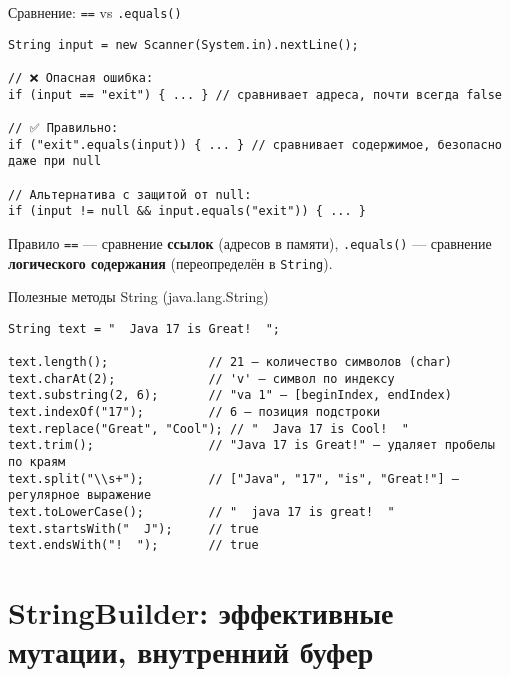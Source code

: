 \documentclass[aspectratio=169]{beamer}
\begin{document}
\begin{frame}[fragile]{Сравнение: \texttt{==} vs \texttt{.equals()}}
\lstset{language=JavaLite}
\begin{lstlisting}
String input = new Scanner(System.in).nextLine();

// ❌ Опасная ошибка:
if (input == "exit") { ... } // сравнивает адреса, почти всегда false

// ✅ Правильно:
if ("exit".equals(input)) { ... } // сравнивает содержимое, безопасно даже при null

// Альтернатива с защитой от null:
if (input != null && input.equals("exit")) { ... }
\end{lstlisting}
  \begin{block}{Правило}
    \texttt{==} — сравнение \textbf{ссылок} (адресов в памяти),  
    \texttt{.equals()} — сравнение \textbf{логического содержания} (переопределён в \texttt{String}).
  \end{block}
\end{frame}

\begin{frame}[fragile]{Полезные методы String (java.lang.String)}
\lstset{language=JavaLite}
\begin{lstlisting}
String text = "  Java 17 is Great!  ";

text.length();              // 21 — количество символов (char)
text.charAt(2);             // 'v' — символ по индексу
text.substring(2, 6);       // "va 1" — [beginIndex, endIndex)
text.indexOf("17");         // 6 — позиция подстроки
text.replace("Great", "Cool"); // "  Java 17 is Cool!  "
text.trim();                // "Java 17 is Great!" — удаляет пробелы по краям
text.split("\\s+");         // ["Java", "17", "is", "Great!"] — регулярное выражение
text.toLowerCase();         // "  java 17 is great!  "
text.startsWith("  J");     // true
text.endsWith("!  ");       // true
\end{lstlisting}
\end{frame}

\section{StringBuilder: эффективные мутации, внутренний буфер}
\end{document}
